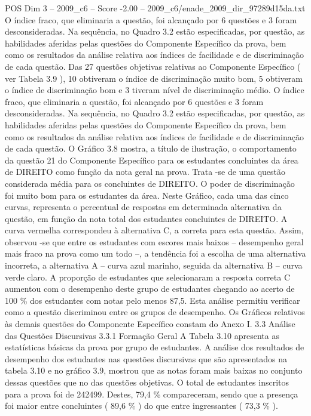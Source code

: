 \begin{textsample}{POS Dim 3 – 2009\_c6 – Score -2.00 – 2009\_c6/enade\_2009\_dir\_97289d15da.txt}
O índice fraco, que eliminaria a questão, foi alcançado por 6 questões e 3 foram desconsideradas.
Na sequência, no Quadro 3.2 estão especificadas, por questão, as habilidades aferidas pelas questões do Componente Específico da prova, bem como os resultados da análise relativa aos índices de facilidade e de discriminação de cada questão.
Das 27 questões objetivas relativas ao Componente Específico ( ver Tabela 3.9 ), 10 obtiveram o índice de discriminação muito bom, 5 obtiveram o índice de discriminação bom e 3 tiveram nível de discriminação médio.
O índice fraco, que eliminaria a questão, foi alcançado por 6 questões e 3 foram desconsideradas.
Na sequência, no Quadro 3.2 estão especificadas, por questão, as habilidades aferidas pelas questões do Componente Específico da prova, bem como os resultados da análise relativa aos índices de facilidade e de discriminação de cada questão.
O Gráfico 3.8 mostra, a título de ilustração, o comportamento da questão 21 do Componente Específico para os estudantes concluintes da área de DIREITO como função da nota geral na prova.
Trata -se de uma questão considerada média para os concluintes de DIREITO.
O poder de discriminação foi muito bom para os estudantes da área.
Neste Gráfico, cada uma das cinco curvas, representa o percentual de respostas em determinada alternativa da questão, em função da nota total dos estudantes concluintes de DIREITO.
A curva vermelha correspondeu à alternativa C, a correta para esta questão.
Assim, observou -se que entre os estudantes com escores mais baixos – desempenho geral mais fraco na prova como um todo –, a tendência foi a escolha de uma alternativa incorreta, a alternativa A – curva azul marinho, seguida da alternativa B – curva verde claro.
A proporção de estudantes que selecionaram a resposta correta C aumentou com o desempenho deste grupo de estudantes chegando ao acerto de 100 \% dos estudantes com notas pelo menos 87,5.
Esta análise permitiu verificar como a questão discriminou entre os grupos de desempenho.
Os Gráficos relativos às demais questões do Componente Específico constam do Anexo I. 3.3 Análise das Questões Discursivas 3.3.1 Formação Geral A Tabela 3.10 apresenta as estatísticas básicas da prova por grupo de estudantes.
A análise dos resultados de desempenho dos estudantes nas questões discursivas que são apresentados na tabela 3.10 e no gráfico 3.9, mostrou que as notas foram mais baixas no conjunto dessas questões que no das questões objetivas.
O total de estudantes inscritos para a prova foi de 242499.
Destes, 79,4 \% compareceram, sendo que a presença foi maior entre concluintes ( 89,6 \% ) do que entre ingressantes ( 73,3 \% ).

\end{textsample}
